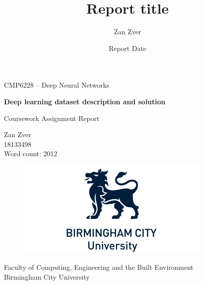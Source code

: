 \documentclass[12pt,a4paper]{article}
\title{Report title}
\author{Zan Zver}
\date{Report Date }
\newcommand{\authorName}{Zan Zver}
\newcommand{\authorID}{18133498}
\newcommand{\reportTitle}{Deep learning dataset description and solution}
\begin{document}
\begin{titlepage}
   \begin{center}
       CMP6228 – Deep Neural Networks
       \vspace*{0.5cm}

       \huge\textbf{\reportTitle} 

       \vspace{0.5cm}
        Coursework Assignment Report
            
       \vspace{1.5cm}

       \authorName \\
       \authorID\\
       \vspace{0.5cm}
       \large{Word count: 2012}


       \vfill
            
       \vspace{0.8cm}
     
       \begin{figure}[htp]
        \centering
        \includegraphics{logo}
        \end{figure}
            
       \large{Faculty of Computing, Engineering and the Built Environment \\
       Birmingham City University \\}
            
   \end{center}
\end{titlepage}
\pagestyle{fancy}
\fancyhf{}
\setlength{\headsep}{50pt}
\end{document}
